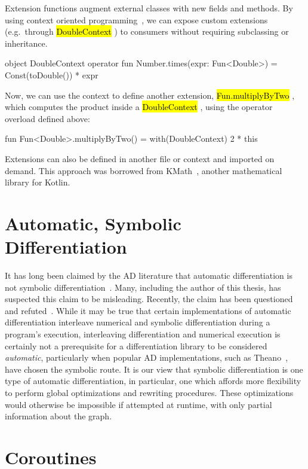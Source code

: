 \documentclass[12pt,initial,twoside,maitrise]{dms}
\newcommand{\inline}[1]{%
\begingroup%
\sethlcolor{slightgray}%
\hl{\ttfamily\small #1}%
\endgroup
}
\numberwithin{equation}{section}
\numberwithin{table}{chapter}
\numberwithin{figure}{chapter}
\begin{document}
Extension functions augment external classes with new fields and methods. By using context oriented programming~\citep{hirschfeld2008context}, we can expose custom extensions (e.g.\ through \inline{DoubleContext}) to consumers without requiring subclassing or inheritance.
%
\begin{kotlinlisting}[caption={We can provide numerical extensions, wrapped in a context.}]
object DoubleContext {
    operator fun Number.times(expr: Fun<Double>) = Const(toDouble()) * expr
}
\end{kotlinlisting}
%
Now, we can use the context to define another extension, \inline{Fun.multiplyByTwo}, which computes the product inside a \inline{DoubleContext}, using the operator overload defined above:
%
\begin{kotlinlisting}
fun Fun<Double>.multiplyByTwo() = with(DoubleContext) { 2 * this }
\end{kotlinlisting}
%
Extensions can also be defined in another file or context and imported on demand. This approach was borrowed from KMath~\citep{nozik2019acat}, another mathematical library for Kotlin.

\section{Automatic, Symbolic Differentiation}

It has long been claimed by the AD literature that automatic differentiation is not symbolic differentiation~\citep{baydin-survey}. Many, including the author of this thesis, has suspected this claim to be misleading. Recently, the claim has been questioned~\citep{wang2018demystifying} and refuted~\citep{laue2019equivalence}. While it may be true that certain implementations of automatic differentiation interleave numerical and symbolic differentiation during a program's execution, interleaving differentiation and numerical execution is certainly not a prerequisite for a differentiation library to be considered \textit{automatic}, particularly when popular AD implementations, such as Theano~\citep{theano}, have chosen the symbolic route. It is our view that symbolic differentiation is one type of automatic differentiation, in particular, one which affords more flexibility to perform global optimizations and rewriting procedures. These optimizations would otherwise be impossible if attempted at runtime, with only partial information about the graph.

\section{Coroutines}\label{sec:coroutines}
\end{document}
